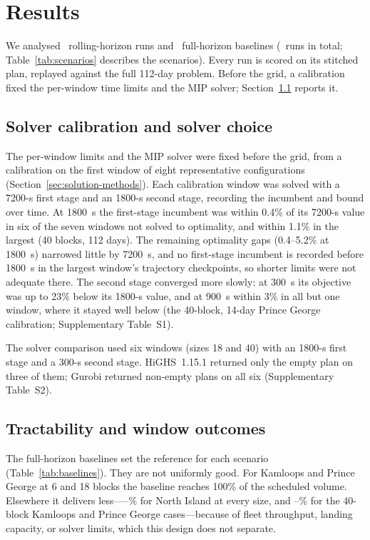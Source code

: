 \section{Results}

We analysed \NRollingRuns\ rolling-horizon runs and \NBaselineRuns\ full-horizon baselines
(\NRuns\ runs in total; Table~\ref{tab:scenarios} describes the scenarios). Every run is scored on
its stitched plan, replayed against the full 112-day problem. Before the grid, a calibration fixed
the per-window time limits and the MIP solver; Section~\ref{sec:calibration} reports it.

\subsection{Solver calibration and solver choice}
\label{sec:calibration}

The per-window limits and the MIP solver were fixed before the grid, from a calibration on the first
window of eight representative configurations (Section~\ref{sec:solution-methods}). Each calibration
window was solved with a 7200-s first stage and an 1800-s second stage, recording the incumbent and
bound over time. At 1800~s the first-stage incumbent was within 0.4\% of its 7200-s value in six of
the seven windows not solved to optimality, and within 1.1\% in the largest (40 blocks, 112 days).
The remaining optimality gaps (0.4--5.2\% at 1800~s) narrowed little by 7200~s, and no first-stage
incumbent is recorded before 1800~s in the largest window's trajectory checkpoints, so shorter limits
were not adequate there. The second stage converged more slowly: at 300~s its objective was up to
23\% below its 1800-s value, and at 900~s within 3\% in all but one window, where it stayed well
below (the 40-block, 14-day Prince George calibration; Supplementary Table~S1).

The solver comparison used six windows (sizes 18 and 40) with an 1800-s first stage and a 300-s
second stage. HiGHS~1.15.1 returned only the empty plan on three of them; Gurobi returned non-empty
plans on all six (Supplementary Table~S2).

\subsection{Tractability and window outcomes}

The full-horizon baselines set the reference for each scenario (Table~\ref{tab:baselines}). They
are not uniformly good. For Kamloops and Prince George at 6 and 18 blocks the baseline reaches
100\% of the scheduled volume. Elsewhere it delivers less---\BaselineShareNILow--\BaselineShareNIHigh\%
for North Island at every size, and \BaselineShareLargeLow--\BaselineShareLargeHigh\% for the
40-block Kamloops and Prince George cases---because of fleet throughput, landing capacity, or
solver limits, which this design does not separate.

